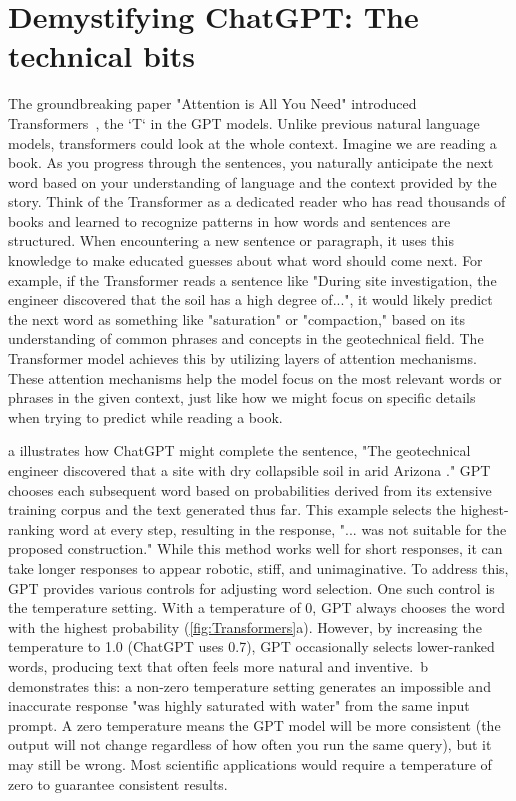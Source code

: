 \documentclass{article}
\begin{document}
\section{Demystifying ChatGPT: The technical bits}
The groundbreaking paper "Attention is All You Need" introduced Transformers~\parencite{vaswani2017attention}, the `T` in the GPT models. Unlike previous natural language models, transformers could look at the whole context. Imagine we are reading a book. As you progress through the sentences, you naturally anticipate the next word based on your understanding of language and the context provided by the story. Think of the Transformer as a dedicated reader who has read thousands of books and learned to recognize patterns in how words and sentences are structured. When encountering a new sentence or paragraph, it uses this knowledge to make educated guesses about what word should come next. For example, if the Transformer reads a sentence like "During site investigation, the engineer discovered that the soil has a high degree of...", it would likely predict the next word as something like "saturation" or "compaction," based on its understanding of common phrases and concepts in the geotechnical field. The Transformer model achieves this by utilizing layers of attention mechanisms. These attention mechanisms help the model focus on the most relevant words or phrases in the given context, just like how we might focus on specific details when trying to predict while reading a book.

a illustrates how ChatGPT might complete the sentence, "The geotechnical engineer discovered that a site with dry collapsible soil in arid Arizona \underline{\hspace{1cm}}." GPT chooses each subsequent word based on probabilities derived from its extensive training corpus and the text generated thus far. This example selects the highest-ranking word at every step, resulting in the response, "... was not suitable for the proposed construction." While this method works well for short responses, it can take longer responses to appear robotic, stiff, and unimaginative. To address this, GPT provides various controls for adjusting word selection. One such control is the temperature setting. With a temperature of 0, GPT always chooses the word with the highest probability (\cref{fig:Transformers}a). However, by increasing the temperature to 1.0 (ChatGPT uses 0.7), GPT occasionally selects lower-ranked words, producing text that often feels more natural and inventive.~b demonstrates this: a non-zero temperature setting generates an impossible and inaccurate response "was highly saturated with water" from the same input prompt. A zero temperature means the GPT model will be more consistent (the output will not change regardless of how often you run the same query), but it may still be wrong. Most scientific applications would require a temperature of zero to guarantee consistent results. 
\end{document}

